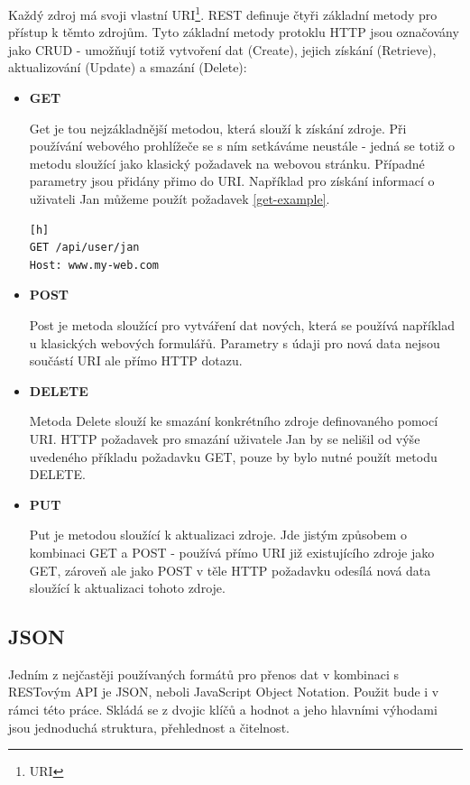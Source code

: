 \documentclass[thesis=B,czech]{FITthesis}[2012/06/26]
\begin{document}
	Každý zdroj má svoji vlastní URI\footnote{URI}. REST definuje čtyři základní metody pro přístup k těmto zdrojům. Tyto základní metody protoklu HTTP jsou označovány jako CRUD - umožňují totiž vytvoření dat (Create), jejich získání (Retrieve), aktualizování (Update) a smazání (Delete):
\begin{itemize}

\item\textbf{GET}

Get je tou nejzákladnější metodou, která slouží k získání zdroje. Při používání webového prohlížeče se s ním setkáváme neustále - jedná se totiž o metodu sloužící jako klasický požadavek na webovou stránku. Případné parametry jsou přidány přimo do URI. Například pro získání informací o uživateli Jan můžeme použít požadavek \ref{get-example}.
\begin{lstlisting}[caption={Ukázka požadavku GET},label=get-example][h]
GET /api/user/jan
Host: www.my-web.com
\end{lstlisting}

\item\textbf{POST}

Post je metoda sloužící pro vytváření dat nových, která se používá například u klasických webových formulářů. Parametry s údaji pro nová data nejsou součástí URI ale přímo HTTP dotazu. 

\item\textbf{DELETE}

Metoda Delete slouží ke smazání konkrétního zdroje definovaného pomocí URI. HTTP požadavek pro smazání uživatele Jan by se nelišil od výše uvedeného příkladu požadavku GET, pouze by bylo nutné použít metodu DELETE. 

\item\textbf{PUT}

Put je metodou sloužící k aktualizaci zdroje. Jde jistým způsobem o kombinaci GET a POST - používá přímo URI již existujícího zdroje jako GET, zároveň ale jako POST v těle HTTP požadavku odesílá nová data sloužící k aktualizaci tohoto zdroje. 

\end{itemize}

	
\subsection{JSON}	
	Jedním z nejčastěji používaných formátů pro přenos dat v kombinaci s RESTovým API je JSON, neboli JavaScript Object Notation. Použit bude i v rámci této práce. Skládá se z dvojic klíčů a hodnot a jeho hlavními výhodami jsou jednoduchá struktura, přehlednost a čitelnost. 
	
\end{document}
